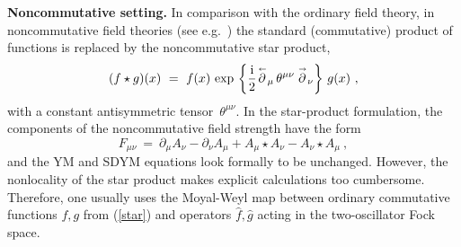 \documentclass[a4paper,11pt]{article}
\numberwithin{equation}{section}
\def\th{\theta}
\def\pa{\partial}
\def\rd#1{\buildrel{_{_{\hskip 0.01in}\rightarrow}}\over{#1}}
\def\ld#1{\buildrel{_{_{\hskip 0.01in}\leftarrow}}\over{#1}}
\newcommand{\im}{\mathrm{i}}
\begin{document}
{\bf Noncommutative setting.}
In comparison with the  ordinary field theory, in noncommutative field theories 
(see e.g.~\cite{Douglas:2001}) the standard (commutative)  product of functions is replaced 
by the noncommutative star product,
\begin{equation}{\label{star}}
(f \star g)(x)\ =\ f(x)\,\exp\,\left\{ \frac{\im}{2}
{\ld{\partial}}_\mu \,\theta^{\mu\nu}\, {\rd{\partial}}_\nu \right\}\,g(x) \ ,
\end{equation}
with a constant antisymmetric tensor~$\th^{\mu\nu}$.
In the star-product formulation, the components of the noncommutative field 
strength have the form
\begin{equation}
{}F_{\mu\nu}\ =\ \pa_\mu A_\nu-\pa_\nu A_\mu+A_\mu\star A_\nu-A_\nu\star A_\mu\ ,
\end{equation}
and the YM and SDYM equations look formally to be unchanged.
However, the nonlocality of the star product makes explicit calculations
too cumbersome. Therefore, one usually uses the Moyal-Weyl map
between ordinary commutative functions $f, g$ from (\ref{star})
and operators $\hat f, \hat g$ acting in the two-oscillator Fock space.
\end{document}
